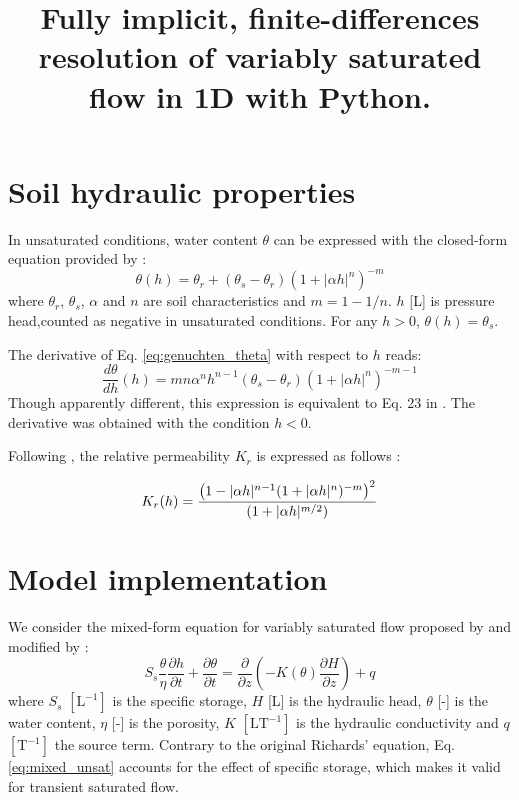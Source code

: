 \documentclass[a4paper,12pt]{article}
\title{Fully implicit, finite-differences resolution of variably saturated flow in 1D  with Python.}
\author{}
\begin{document}
\maketitle

\section{Soil hydraulic properties}

In unsaturated conditions, water content $\theta$ can be expressed with the closed-form equation provided by \cite{Genuchten1980} :
\begin{equation} \label{eq:genuchten_theta}
    \theta(h) =  \theta_r + (\theta_s - \theta_r) \left( 1+ |\alpha h|^n \right)^{-m}  
\end{equation}
where $\theta_r$, $\theta_s$, $\alpha$ and $n$ are soil characteristics and $m = 1- 1/n$. $h$ [L] is pressure head,counted as negative in unsaturated conditions. For any $h>0$, $\theta(h) = \theta_s$.

The derivative of Eq. \ref{eq:genuchten_theta} with respect to $h$ reads: 
\begin{equation} \label{eq:dtheta_dh}
    \frac{d\theta}{dh}(h) = m n \alpha^n h^{n-1} 
       (\theta_s - \theta_r) \left( 1+ |\alpha h|^n \right)^{-m-1}
\end{equation}
Though apparently different, this expression is equivalent to Eq. 23 in \cite{Genuchten1980}. The derivative was obtained with the condition $h<0$.

Following \cite{Genuchten1980}, the relative permeability $K_r$ is expressed as follows \citep{Genuchten1980}:


\begin{equation} \label{eq:K_r}
    K_r(h) = { { \left( 1-|\alpha h|^{n-1} (1+|\alpha h|^n)^{-m} \right)^2 } \over
		{ (1+ |\alpha h|^{m/2} ) } }
\end{equation}

\section{Model implementation}
We consider the mixed-form equation for variably saturated flow proposed by \cite{Celiaetal1990} and modified by \cite{Clementetal1994}:
\begin{equation} \label{eq:mixed_unsat}
    S_s \frac{\theta}{\eta} \frac{\partial h}{\partial t} + \frac{\partial \theta}{\partial t} = 
    \frac{\partial}{\partial z} \left(-K(\theta) \frac{\partial H}{\partial z} \right) + q
\end{equation}
where $S_s$ $\mathrm{[L^{-1}]}$ is the specific storage, $H$ [L] is the hydraulic head, $\theta$ [-] is the water content, $\eta$ [-] is the porosity, $K$ $\mathrm{[LT^{-1}]}$ is the hydraulic conductivity and $q$ $\mathrm{[T^{-1}]}$ the source term. Contrary to the original Richards' equation, Eq. \ref{eq:mixed_unsat} accounts for the effect of specific storage, which makes it valid for transient saturated flow.
\end{document}
